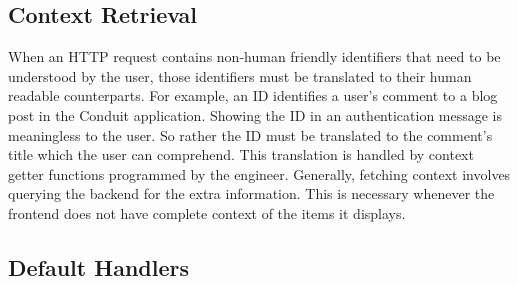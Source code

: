 \subsection{Context Retrieval}\label{Sec:ContextRetrieval}


When an HTTP request contains non-human friendly identifiers that need to be understood by the user, those identifiers must be translated to their human readable counterparts. For example, an ID identifies a user's comment to a blog post in the Conduit application. Showing the ID in an authentication message is meaningless to the user. So rather the ID must be translated to the comment's title which the user can comprehend. This translation is handled by context getter functions programmed by the engineer. Generally, fetching context involves querying the backend for the extra information. This is necessary whenever the frontend does not have complete context of the items it displays. 





  




\subsection{Default Handlers}\label{Sec:DefaultHandlers}

